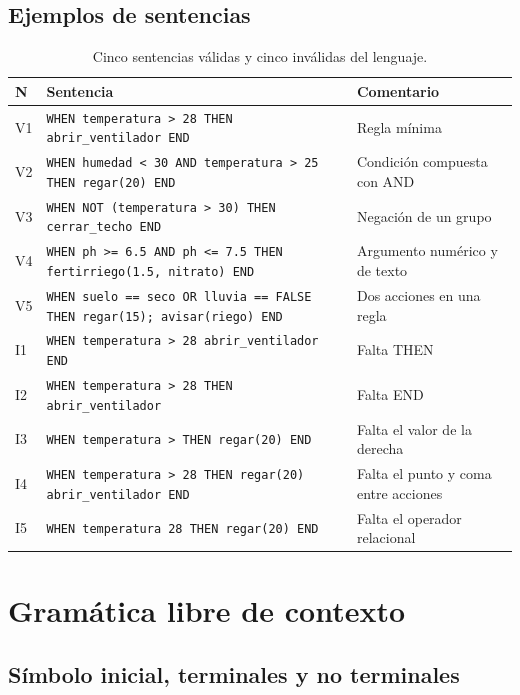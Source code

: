 \documentclass[11pt,letterpaper]{article}
\newcommand{\code}[1]{\texttt{#1}}
\newcommand{\dq}{\textquotedbl{}}
\begin{document}
\subsection{Ejemplos de sentencias}

\begin{table}[htbp]
\centering
\caption{Cinco sentencias válidas y cinco inválidas del lenguaje.}
\label{tab:ejemplos}
\footnotesize
\begin{tabular}{L{0.7cm}L{9.3cm}L{5.4cm}}
\toprule
\textbf{N} & \textbf{Sentencia} & \textbf{Comentario} \\
\midrule
V1 & \code{WHEN temperatura > 28 THEN abrir\_ventilador END} & Regla mínima \\
V2 & \code{WHEN humedad < 30 AND temperatura > 25 THEN regar(20) END} & Condición compuesta con AND \\
V3 & \code{WHEN NOT (temperatura > 30) THEN cerrar\_techo END} & Negación de un grupo \\
V4 & \code{WHEN ph >= 6.5 AND ph <= 7.5 THEN fertirriego(1.5, \dq nitrato\dq) END} & Argumento numérico y de texto \\
V5 & \code{WHEN suelo == seco OR lluvia == FALSE THEN regar(15); avisar(\dq riego\dq) END} & Dos acciones en una regla \\
\midrule
I1 & \code{WHEN temperatura > 28 abrir\_ventilador END} & Falta THEN \\
I2 & \code{WHEN temperatura > 28 THEN abrir\_ventilador} & Falta END \\
I3 & \code{WHEN temperatura > THEN regar(20) END} & Falta el valor de la derecha \\
I4 & \code{WHEN temperatura > 28 THEN regar(20) abrir\_ventilador END} & Falta el punto y coma entre acciones \\
I5 & \code{WHEN temperatura 28 THEN regar(20) END} & Falta el operador relacional \\
\bottomrule
\end{tabular}
\end{table}

\section{Gramática libre de contexto}

\subsection{Símbolo inicial, terminales y no terminales}
\end{document}
